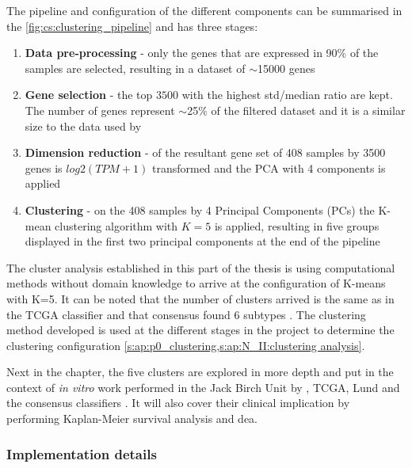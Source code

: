 The pipeline and configuration of the different components can be summarised in the \cref{fig:cs:clustering_pipeline} and has three stages:
\begin{enumerate}
    \item \textbf{Data pre-processing} - only the genes that are expressed in 90\% of the samples are selected, resulting in a dataset of $\sim$15000 genes
    \item \textbf{Gene selection} - the top $3500$ with the highest std/median ratio are kept. The number of genes represent $\sim$25\% of the filtered dataset and it is a similar size to the data used by \citet{Robertson2017-mg}
    \item \textbf{Dimension reduction} - of the resultant gene set of 408 samples by 3500 genes is $log2(TPM+1)$ transformed and the PCA with 4 components is applied
    \item \textbf{Clustering} - on the 408 samples by 4 Principal Components (PCs) the K-mean clustering algorithm with $K=5$ is applied, resulting in five groups displayed in the first two principal components at the end of the pipeline
\end{enumerate}

The cluster analysis established in this part of the thesis is using computational methods without domain knowledge to arrive at the configuration of K-means with K=5. It can be noted that the number of clusters arrived is the same as in the TCGA classifier \citep{Robertson2017-mg} and that consensus found 6 subtypes \citep{Kamoun2020-tj}. The clustering method developed is used at the different stages in the project to determine the clustering configuration \cref{s:ap:p0_clustering,s:ap:N_II:clustering analysis}.

Next in the chapter, the five clusters are explored in more depth and put in the context of \textit{in vitro} work performed in the Jack Birch Unit by \citet{Baker2022-bj}, TCGA, Lund and the consensus classifiers \citep{Robertson2017-mg, Marzouka2018-ge, Kamoun2020-tj}. It will also cover their clinical implication by performing Kaplan-Meier survival analysis and \acrlong{dea}.

\subsubsection*{Implementation details}

